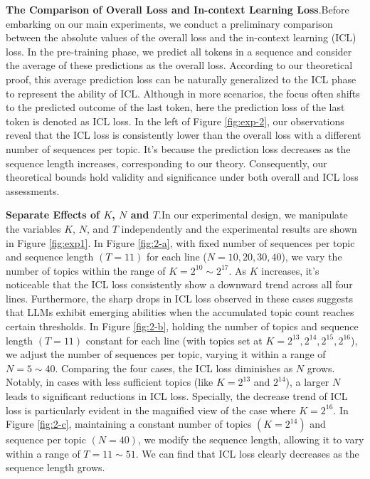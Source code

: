 \textbf{The Comparison of Overall Loss and In-context Learning Loss}.\quad Before embarking on our main experiments, we conduct a preliminary comparison between the absolute values of the overall loss and the in-context learning (ICL) loss. In the pre-training phase, we predict all tokens in a sequence and consider the average of these predictions as the overall loss. According to our theoretical proof, this average prediction loss can be naturally generalized to the ICL phase to represent the ability of ICL. Although in more scenarios, the focus often shifts to the predicted outcome of the last token, here the prediction loss of the last token is denoted as ICL loss. In the left of Figure \ref{fig:exp-2}, our observations reveal that the ICL loss is consistently lower than the overall loss with a different number of sequences per topic. It's because the prediction loss decreases as the sequence length increases, corresponding to our theory. Consequently, our theoretical bounds hold validity and significance under both overall and ICL loss assessments.


\textbf{Separate Effects of $K$, $N$ and $T$}.\quad In our experimental design, we manipulate the variables $K$, $N$, and $T$ independently and the experimental results are shown in Figure \ref{fig:exp1}. In Figure \ref{fig:2-a}, with fixed number of sequences per topic and sequence length $(T=11)$ for each line ($N=10,20,30,40$), we vary the number of topics within the range of $K=2^{10} \sim 2^{17}$. As $K$ increases, it's noticeable that the ICL loss consistently show a downward trend across all four lines. Furthermore, the sharp drops in ICL loss observed in these cases suggests that LLMs exhibit emerging abilities when the accumulated topic count reaches certain thresholds. In Figure \ref{fig:2-b}, holding the number of topics and sequence length $(T=11)$ constant for each line (with topics set at $K=2^{13},2^{14},2^{15},2^{16}$), we adjust the number of sequences per topic, varying it within a range of $N=5 \sim 40$. Comparing the four cases, the ICL loss diminishes as $N$ grows. Notably, in cases with less sufficient topics (like $K=2^{13}$ and $2^{14}$), a larger $N$ leads to significant reductions in ICL loss. Specially, the decrease trend of ICL loss is particularly evident in the magnified view of the case where $K=2^{16}$. In Figure \ref{fig:2-c}, maintaining a constant number of topics $(K=2^{14})$ and sequence per topic $(N=40)$, we modify the sequence length, allowing it to vary within a range of $T=11 \sim 51$. We can find that ICL loss clearly decreases as the sequence length grows.

